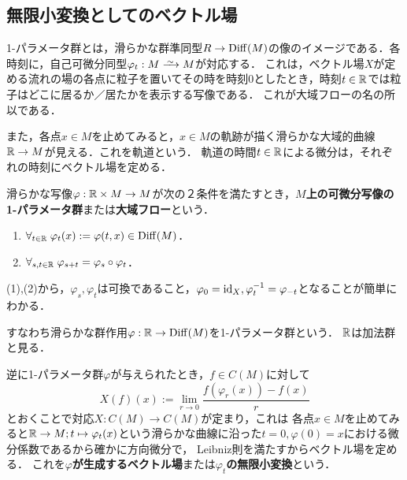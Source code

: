 \documentclass[uplatex,dvipdfmx]{jsreport}
\begin{document}
\subsection{無限小変換としてのベクトル場}

\begin{tcolorbox}[colframe=ForestGreen, colback=ForestGreen!10!white,breakable,colbacktitle=ForestGreen!40!white,coltitle=black,fonttitle=\bfseries\sffamily,
title=ベクトル場を通じて多様体の形を考えたい]
    1-パラメータ群とは，滑らかな群準同型$R\to\mathrm{Diff}(M)$の像のイメージである．各時刻に，自己可微分同型$\varphi_t:M\iso M$が対応する．
    これは，ベクトル場$X$が定める流れの場の各点に粒子を置いてその時を時刻$0$としたとき，時刻$t\in\mathbb{R}$では粒子はどこに居るか／居たかを表示する写像である．
    これが大域フローの名の所以である．

    また，各点$x\in M$を止めてみると，$x\in M$の軌跡が描く滑らかな大域的曲線$\mathbb{R}\to M$が見える．これを軌道という．
    軌道の時間$t\in\mathbb{R}$による微分は，それぞれの時刻にベクトル場を定める．
\end{tcolorbox}

\begin{definition}
    滑らかな写像$\varphi:\mathbb{R}\times M\to M$が次の２条件を満たすとき，\textbf{$M$上の可微分写像の1-パラメータ群}または\textbf{大域フロー}という．
    \begin{enumerate}
        \item $\forall_{t\in\mathbb{R}}\;\varphi_t(x):=\varphi(t,x)\in\mathrm{Diff}(M)$．
        \item $\forall_{s,t\in\mathbb{R}}\;\varphi_{s+t}=\varphi_s\circ\varphi_t$．
    \end{enumerate}
    (1),(2)から，$\varphi_s,\varphi_t$は可換であること，$\varphi_0=\mathrm{id}_X,\varphi_t^{-1}=\varphi_{-t}$となることが簡単にわかる．
\end{definition}
\begin{remarks}
    すなわち滑らかな群作用$\varphi:\mathbb{R}\to\mathrm{Diff}(M)$を1-パラメータ群という．
    $\mathbb{R}$は加法群と見る．
\end{remarks}

\begin{definition}
    逆に1-パラメータ群$\varphi$が与えられたとき，$f\in C(M)$に対して
    \[X(f)(x):=\lim_{r\to 0}\frac{f(\varphi_r(x))-f(x)}{r}\]
    とおくことで対応$X:C(M)\to C(M)$が定まり，これは
    各点$x\in M$を止めてみると$\mathbb{R}\to M;t\mapsto\varphi_t(x)$という滑らかな曲線に沿った$t=0,\varphi(0)=x$における微分係数であるから確かに方向微分で，
    Leibniz則を満たすからベクトル場を定める．
    これを\textbf{$\varphi$が生成するベクトル場}または\textbf{$\varphi_t$の無限小変換}という．
\end{definition}
\end{document}
